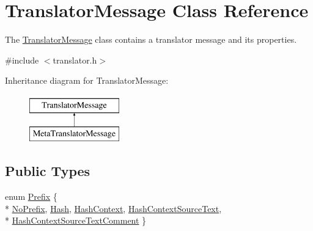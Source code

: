\hypertarget{classTranslatorMessage}{}\section{Translator\+Message Class Reference}
\label{classTranslatorMessage}


The \hyperlink{classTranslatorMessage}{Translator\+Message} class contains a translator message and its properties.  




{\ttfamily \#include $<$translator.\+h$>$}

Inheritance diagram for Translator\+Message\+:\begin{figure}[H]
\begin{center}
\leavevmode
\includegraphics[height=2.000000cm]{classTranslatorMessage}
\end{center}
\end{figure}
\subsection*{Public Types}
\begin{DoxyCompactItemize}
\item 
enum \hyperlink{classTranslatorMessage_ad2e3272d30541e7634ce0050c67fc38c}{Prefix} \{ \\*
\hyperlink{classTranslatorMessage_ad2e3272d30541e7634ce0050c67fc38ca3d11fbec7af01e017bc3930be2d0d174}{No\+Prefix}, 
\hyperlink{classTranslatorMessage_ad2e3272d30541e7634ce0050c67fc38caedb018c87665d90e9a83d3e486ee46fa}{Hash}, 
\hyperlink{classTranslatorMessage_ad2e3272d30541e7634ce0050c67fc38ca99e97adab75c4c56d1c3e079a2cbff32}{Hash\+Context}, 
\hyperlink{classTranslatorMessage_ad2e3272d30541e7634ce0050c67fc38ca895ff04dac01248c6ecb772d8566db53}{Hash\+Context\+Source\+Text}, 
\\*
\hyperlink{classTranslatorMessage_ad2e3272d30541e7634ce0050c67fc38ca67425b32943886b754e9d6e3cc081c39}{Hash\+Context\+Source\+Text\+Comment}
 \}
\end{DoxyCompactItemize}
